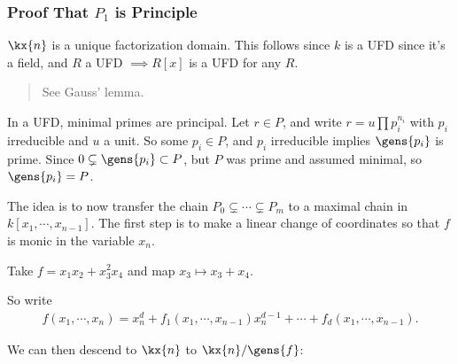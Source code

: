 \hypertarget{proof-that-p_1-is-principle}{%
\subsubsection{\texorpdfstring{Proof That \(P_1\) is
Principle}{Proof That P\_1 is Principle}}\label{proof-that-p_1-is-principle}}

\begin{claim}

\(\kx{n}\) is a unique factorization domain. This follows since \(k\) is
a UFD since it's a field, and \(R\) a UFD \(\implies R[x]\) is a UFD for
any \(R\).

\begin{quote}
See Gauss' lemma.
\end{quote}

\end{claim}

\begin{claim}

In a UFD, minimal primes are principal. Let \(r \in P\), and write
\(r = u \prod p_i^{n_i}\) with \(p_i\) irreducible and \(u\) a unit. So
some \(p_i\in P\), and \(p_i\) irreducible implies \(\gens{p_i}\) is
prime. Since \(0 \subsetneq \gens{p_i} \subset P\), but \(P\) was prime
and assumed minimal, so \(\gens{p_i} = P\).

\end{claim}

The idea is to now transfer the chain
\(P_0 \subsetneq \cdots \subsetneq P_m\) to a maximal chain in
\(k[x_1, \cdots, x_{n-1}]\). The first step is to make a linear change
of coordinates so that \(f\) is monic in the variable \(x_n\).

\begin{example}

Take \(f=x_1x_2 + x_3^2 x_4\) and map \(x_3 \mapsto x_3 + x_4\).

\end{example}

So write
\begin{align*}  
f(x_1, \cdots, x_n) = x_n^d + f_1(x_1, \cdots, x_{n-1}) x_n^{d-1} + \cdots + f_d(x_1, \cdots, x_{n-1})
.\end{align*}

We can then descend to \(\kx{n}\) to \(\kx{n}/\gens{f}\):

\begin{center}\end{center}

